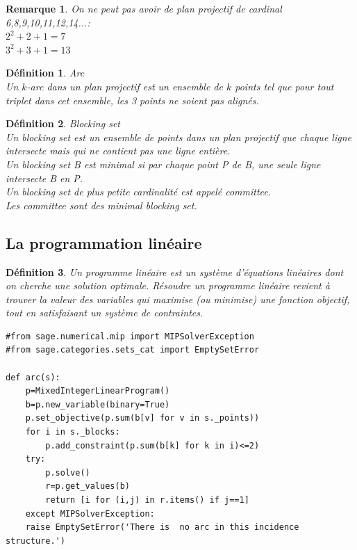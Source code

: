 \documentclass[a4paper]{article}
\newtheorem{Rem}{Remarque}[subsection]
\newtheorem{Def}{Définition}
\begin{document}
\begin{Rem}
On ne peut pas avoir de plan projectif de cardinal 6,8,9,10,11,12,14...: \\
$2^2+2+1=7$ \\
$3^2+3+1=13$
\end{Rem}

\begin{Def}{Arc} \\
  Un $k$-arc dans un plan projectif est un ensemble de $k$ points tel que pour tout triplet dans cet ensemble, les 3 points ne soient pas alignés.
\end{Def}

\begin{Def}{Blocking set}\\
  Un \textit{blocking set} est un ensemble de points dans un plan projectif que chaque ligne intersecte mais qui ne contient pas une ligne entière.\\
  Un \textit{blocking set} B est minimal si par chaque point P de B, une seule ligne intersecte B en P.\\
  Un \textit{blocking set} de plus petite cardinalité est appelé \textit{committee}.\\
  Les \textit{committee} sont des \textit{minimal blocking set}.
\end{Def}

\newpage
\subsection{La programmation linéaire}
\begin{Def}
  Un programme linéaire est un système d’équations linéaires dont on cherche une solution optimale. Résoudre un programme linéaire revient à trouver la valeur des variables qui maximise (ou minimise) une fonction objectif, tout en satisfaisant un système de contraintes.
\end{Def}

\begin{lstlisting}
#from sage.numerical.mip import MIPSolverException
#from sage.categories.sets_cat import EmptySetError
          
def arc(s):   
    p=MixedIntegerLinearProgram()
    b=p.new_variable(binary=True)
    p.set_objective(p.sum(b[v] for v in s._points))
    for i in s._blocks:
        p.add_constraint(p.sum(b[k] for k in i)<=2)
    try:
        p.solve()
        r=p.get_values(b)
        return [i for (i,j) in r.items() if j==1]
    except MIPSolverException:
    raise EmptySetError('There is  no arc in this incidence structure.')
\end{lstlisting}
\end{document}
